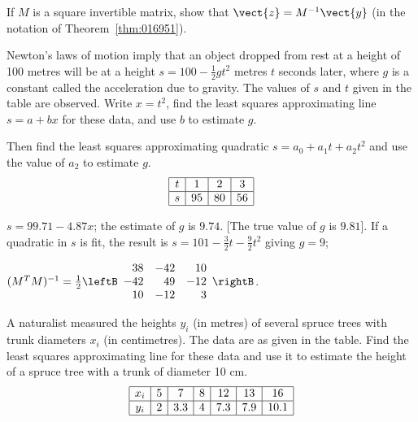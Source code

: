 \begin{multicols}{2}
\begin{ex}
If $M$ is a square invertible matrix, show that $\vect{z} = M^{-1}\vect{y}$ (in the notation of Theorem~\ref{thm:016951}).
\end{ex}

\begin{ex}
Newton's laws of motion imply that an object dropped from rest at a height of 100 metres will be at a height $s = 100 - \frac{1}{2}gt^{2}$ metres $t$ seconds later, where $g$ is a constant called the acceleration due to gravity. The values of $s$ and $t$ given in the table are observed. Write $x = t^{2}$, find the least squares approximating line $s = a + bx$ for these data, and use $b$ to estimate $g$.

Then find the least squares approximating quadratic $s = a_{0} + a_{1}t + a_{2}t^{2}$ and use the value of $a_{2}$ to estimate $g$.
\begin{equation*}
\begin{array}{|c|c|c|c|}
\hline
t &  1 &  2 &  3 \\ \hline
s & 95 & 80 & 56 \\ \hline
\end{array}
\end{equation*}

\begin{sol}
$s = 99.71 - 4.87x$; the estimate of $g$ is $9.74$. [The true value of $g$ is $9.81$]. If a quadratic in $s$ is fit, the result is $s = 101 - \frac{3}{2}t - \frac{9}{2}t^2$ giving $g = 9$;

$(M^TM)^{-1} = \frac{1}{2}
\leftB \begin{array}{rrr}
 38 & -42 &  10 \\
-42 &  49 & -12 \\
 10 & -12 &   3
\end{array} \rightB$.
\end{sol}
\end{ex}

\begin{ex}
A naturalist measured the heights $y_{i}$ (in metres) of several spruce trees with trunk diameters $x_{i}$ (in centimetres). The data are as given in the table. Find the least squares approximating line for these data and use it to estimate the height of a spruce tree with a trunk of diameter 10 cm.
\begin{equation*}
\begin{array}{|c|c|c|c|c|c|c|}
\hline
x_i &  5 &  7 &  8 & 12 & 13 & 16 \\ \hline
y_i &  2 & 3.3 &  4 & 7.3 & 7.9 & 10.1 \\ \hline
\end{array}
\end{equation*}
\end{ex}


\end{multicols}
